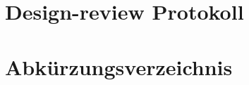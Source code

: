 \documentclass[
11pt, %
a4paper, %
BCOR25mm, %
DIV14, %
footsepline = false, %
headsepline, %
twoside, %
openright,
abstracton, %
listof=totocnumbered, %
bibliography=totocnumbered %
]{scrreprt}
\begin{document}
  \chapter{Design-review Protokoll}\label{chapter:DesignReviewProtokoll}
  
  
  
  \cleardoublepage
  
  
  \chapter{Abkürzungsverzeichnis}\label{chapter:Abkuerzungsverzeichnis}

  
  
  \cleardoublepage
  
  
  \listoffigures
  
  \cleardoublepage
  
  
  \listoftables
  
  \cleardoublepage

    
  \renewcommand{\lstlistlistingname}{Listingverzeichnis}
  
  \lstlistoflistings
  
  \cleardoublepage
  
  
  
  
  
  
  \cleardoublepage
\end{document}
